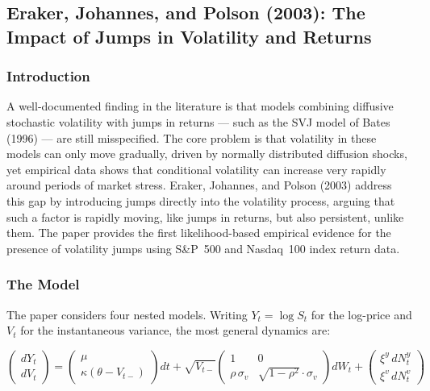 \documentclass[12pt]{article}
\begin{document}
\subsection*{Eraker, Johannes, and Polson (2003): The Impact of Jumps in Volatility and Returns}

\subsubsection*{Introduction}

A well-documented finding in the literature is that models combining diffusive
stochastic volatility with jumps in returns --- such as the SVJ model of Bates
(1996) --- are still misspecified. The core problem is that volatility in these models
can only move gradually, driven by normally distributed diffusion shocks, yet
empirical data shows that conditional volatility can increase very rapidly around
periods of market stress. Eraker, Johannes, and Polson (2003) address this gap
by introducing jumps directly into the volatility process, arguing that such a
factor is rapidly moving, like jumps in returns, but also persistent, unlike them.
The paper provides the first likelihood-based empirical evidence for the presence
of volatility jumps using S\&P~500 and Nasdaq~100 index return data.

\subsubsection*{The Model}

The paper considers four nested models. Writing $Y_t = \log S_t$ for the
log-price and $V_t$ for the instantaneous variance, the most general dynamics are:

\begin{equation}
\begin{pmatrix} dY_t \\ dV_t \end{pmatrix}
= \begin{pmatrix} \mu \\ \kappa(\theta - V_{t-}) \end{pmatrix} dt
+ \sqrt{V_{t-}}
\begin{pmatrix} 1 & 0 \\ \rho\,\sigma_v & \sqrt{1-\rho^2}\cdot\sigma_v \end{pmatrix}
dW_t
+\begin{pmatrix} \xi^y\,dN_t^y \\ \xi^v\,dN_t^v \end{pmatrix}
\end{equation}
\end{document}
